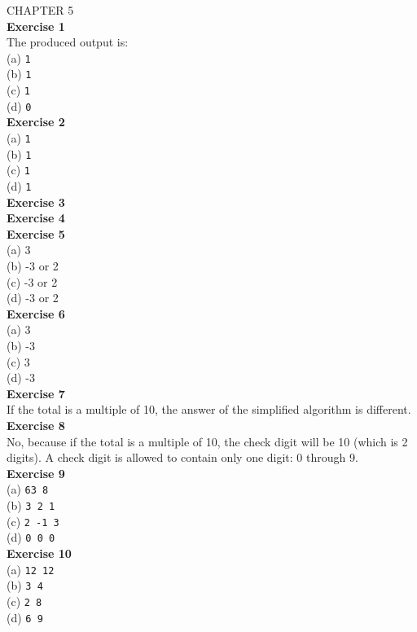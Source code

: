\documentclass[a4paper, 10pt]{article}
\begin{document}
{\LARGE CHAPTER 5} \\

\textbf{Exercise 1} \\
The produced output is: \\
(a) \texttt{1} \\ 
(b) \texttt{1} \\
(c) \texttt{1} \\
(d) \texttt{0} \\

\textbf{Exercise 2} \\
(a) \texttt{1} \\ 
(b) \texttt{1} \\
(c) \texttt{1} \\
(d) \texttt{1} \\

\textbf{Exercise 3} \\


\textbf{Exercise 4} \\

\textbf{Exercise 5} \\
(a) 3 \\
(b) -3 or 2 \\
(c) -3 or 2 \\
(d) -3 or 2 \\

\textbf{Exercise 6} \\
(a) 3 \\
(b) -3 \\
(c) 3 \\
(d) -3 \\

\textbf{Exercise 7} \\
If the total is a multiple of 10, the answer of the simplified algorithm is different. \\

\textbf{Exercise 8} \\
No, because if the total is a multiple of 10, the check digit will be 10 (which is 2 digits). A check digit is allowed to contain only one digit: 0 through 9.\\

\textbf{Exercise 9} \\
(a) \texttt{63 8} \\
(b) \texttt{3 2 1} \\
(c) \texttt{2 -1 3} \\
(d) \texttt{0 0 0} \\

\textbf{Exercise 10} \\
(a) \texttt{12 12} \\
(b) \texttt{3 4} \\
(c) \texttt{2 8} \\
(d) \texttt{6 9} \\
\end{document}

